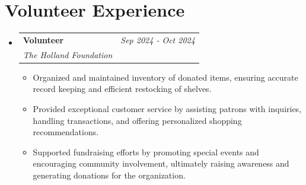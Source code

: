 \documentclass[a4paper,11pt]{article}
\makeatletter
\newcommand{\resumeProject}[4]{
\vspace{0.5mm}\item
    \begin{tabular*}{0.98\textwidth}[t]{l@{\extracolsep{\fill}}r}
        \textbf{#1} & \textit{\footnotesize{#3}} \\
        \footnotesize{\textit{#2}} & \footnotesize{#4}
    \end{tabular*}
    \vspace{-2.4mm}
}
\newcommand{\resumeSubHeadingListStart}{\begin{itemize}[leftmargin=*,labelsep=1mm]}
\newcommand{\resumeItemListStart}{\begin{itemize}[leftmargin=*,labelsep=1mm,itemsep=0.5mm]}
\newcommand{\resumeSubHeadingListEnd}{\end{itemize}\vspace{2mm}}
\newcommand{\resumeItemListEnd}{\end{itemize}\vspace{-2mm}}
\makeatother
\begin{document}
\vspace{-6mm}

\section{\textbf{Volunteer Experience}}
\vspace{-0.4mm}
\resumeSubHeadingListStart

\resumeProject
    {Volunteer}
    {The Holland Foundation}
    {Sep 2024 - Oct 2024}
    {}
\resumeItemListStart
    \item Organized and maintained inventory of donated items, ensuring accurate record keeping and efficient restocking of shelves.
    \item Provided exceptional customer service by assisting patrons with inquiries, handling transactions, and offering personalized shopping recommendations.
    \item Supported fundraising efforts by promoting special events and encouraging community involvement, ultimately raising awareness and generating donations for the organization.
\resumeItemListEnd

\resumeSubHeadingListEnd

\vspace{-6mm}
\end{document}
